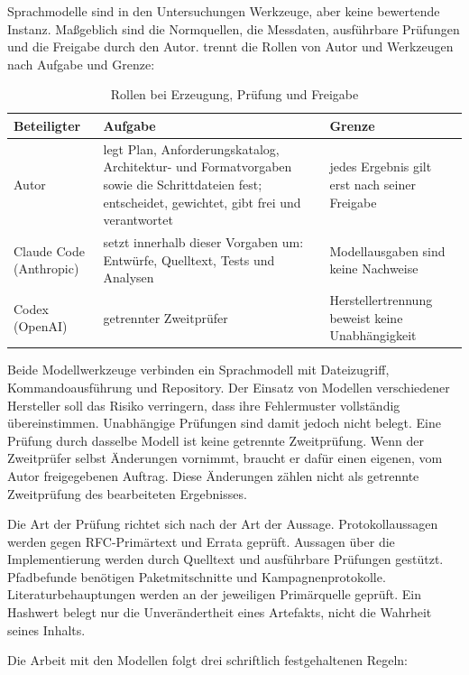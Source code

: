 Sprachmodelle sind in den Untersuchungen Werkzeuge, aber keine bewertende Instanz. Maßgeblich sind die
Normquellen, die Messdaten, ausführbare Prüfungen und die Freigabe durch den Autor. 
trennt die Rollen von Autor und Werkzeugen nach Aufgabe und Grenze:

\begin{table}[htbp]
  \centering
  \caption{Rollen bei Erzeugung, Prüfung und Freigabe}
  \label{tab:rollen}
  \small
  \begin{tabularx}{\textwidth}{@{}L{3.0cm}L{4.4cm}Y@{}}
    \toprule
    \textbf{Beteiligter} & \textbf{Aufgabe} & \textbf{Grenze} \\
    \midrule
    Autor
      & legt Plan, Anforderungskatalog, Architektur- und Formatvorgaben sowie die Schrittdateien fest;
        entscheidet, gewichtet, gibt frei und verantwortet
      & jedes Ergebnis gilt erst nach seiner Freigabe \\
    Claude Code (Anthropic)
      & setzt innerhalb dieser Vorgaben um: Entwürfe, Quelltext, Tests und Analysen
      & Modellausgaben sind keine Nachweise \\
    Codex (OpenAI)
      & getrennter Zweitprüfer
      & Herstellertrennung beweist keine Unabhängigkeit \\
    \bottomrule
  \end{tabularx}
\end{table}

Beide Modellwerkzeuge verbinden ein Sprachmodell mit Dateizugriff, Kommandoausführung und Repository. Der
Einsatz von Modellen verschiedener Hersteller soll das Risiko verringern, dass ihre Fehlermuster vollständig
übereinstimmen. Unabhängige Prüfungen sind damit jedoch nicht belegt. Eine Prüfung durch dasselbe Modell ist
keine getrennte Zweitprüfung. Wenn der Zweitprüfer selbst Änderungen vornimmt, braucht er dafür einen
eigenen, vom Autor freigegebenen Auftrag. Diese Änderungen zählen nicht als getrennte Zweitprüfung des
bearbeiteten Ergebnisses.

Die Art der Prüfung richtet sich nach der Art der Aussage. Protokollaussagen werden gegen RFC-Primärtext und
Errata geprüft. Aussagen über die Implementierung werden durch Quelltext und ausführbare Prüfungen gestützt.
Pfadbefunde benötigen Paketmitschnitte und Kampagnenprotokolle. Literaturbehauptungen werden an der jeweiligen
Primärquelle geprüft. Ein Hashwert belegt nur die Unverändertheit eines Artefakts, nicht die Wahrheit seines
Inhalts.

Die Arbeit mit den Modellen folgt drei schriftlich festgehaltenen Regeln:

